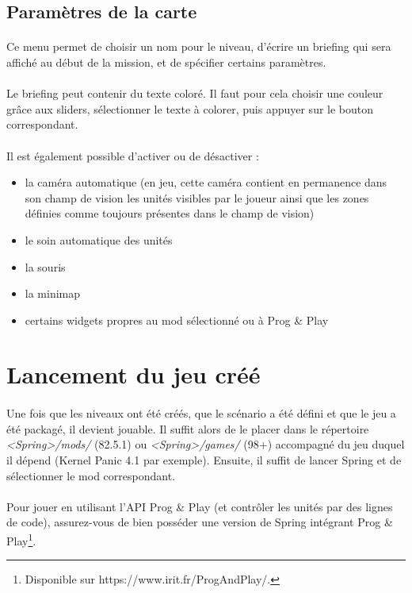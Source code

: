 \documentclass[a4paper]{article}
\begin{document}
\subsection{Paramètres de la carte}
\paragraph{ }
Ce menu permet de choisir un nom pour le niveau, d'écrire un briefing qui sera affiché au début de la mission, et de spécifier certains paramètres.
\paragraph{ }
Le briefing peut contenir du texte coloré. Il faut pour cela choisir une couleur grâce aux sliders, sélectionner le texte à colorer, puis appuyer sur le bouton correspondant.
\paragraph{ }
Il est également possible d'activer ou de désactiver :
\begin{itemize}
\item la caméra automatique (en jeu, cette caméra contient en permanence dans son champ de vision les unités visibles par le joueur ainsi que les zones définies comme toujours présentes dans le champ de vision)
\item le soin automatique des unités
\item la souris
\item la minimap
\item certains widgets propres au mod sélectionné ou à Prog \& Play
\end{itemize}
\section{Lancement du jeu créé}
\paragraph{ }
Une fois que les niveaux ont été créés, que le scénario a été défini et que le jeu a été packagé, il devient jouable. Il suffit alors de le placer dans le répertoire \textit{<Spring>/mods/} (82.5.1) ou \textit{<Spring>/games/} (98+) accompagné du jeu duquel il dépend (Kernel Panic 4.1 par exemple). Ensuite, il suffit de lancer Spring et de sélectionner le mod correspondant.
\paragraph{ }
Pour jouer en utilisant l'API Prog \& Play (et contrôler les unités par des lignes de code), assurez-vous de bien posséder une version de Spring intégrant Prog \& Play\footnote{Disponible sur https://www.irit.fr/ProgAndPlay/.}.
\end{document}

